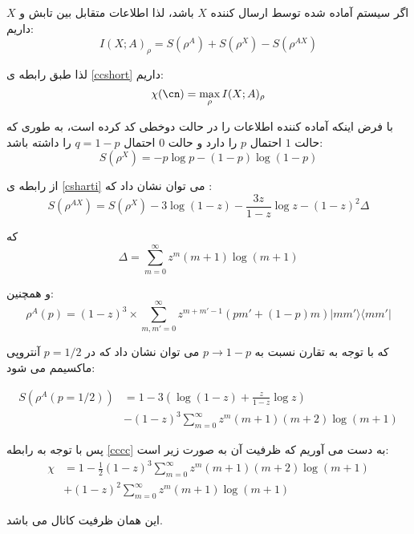 اگر سیستم آماده شده توسط ارسال کننده 
$X$
باشد، لذا اطلاعات متقابل بین تابش و 
$X$
داریم:
\begin{equation} \label{cccc}
	I(X;A)_\rho = S(\rho^A) + S(\rho^X) - S(\rho^{AX})
\end{equation}

لذا طبق رابطه ی 
\ref{ccshort}
داریم:
\begin{equation}
\chi(\cn) = \max_\rho I(X;A)_\rho
\end{equation}

با فرض اینکه آماده کننده اطلاعات را در حالت دوخطی
کد کرده است، به طوری که حالت 
$1$
 احتمال
$p$
را دارد و حالت 
$0$
احتمال
$q=1-p$
را داشته باشد:
\begin{equation}
	S(\rho^X) = -p \log p - (1-p) \log (1-p)
\end{equation}

از رابطه ی
\ref{csharti}
می توان نشان داد که 
\cite{cit}
:
\begin{equation}
	S(\rho^{AX}) = S(\rho^X) - 3 \log (1-z) - \frac{3z}{1-z} \log z - (1-z)^2 \Delta
\end{equation}

که 
\begin{equation}
	\Delta = \sum_{m=0}^{\infty} z^m (m+1) \log(m+1)
\end{equation}

و همچنین:
\begin{equation}
	\rho^A (p) = (1-z)^3 \times \sum_{m,m' =0}^{\infty} z^{m+m'-1} (pm' + (1-p)m) |mm'\rangle \langle mm'|
\end{equation}

که با توجه به تقارن نسبت به 
$p \to 1-p$
می توان نشان داد که در 
$p=1/2$
آنتروپی ماکسیمم می شود:

\begin{align}
	S(\rho^A(p=1/2)) &= 1- 3(\log(1-z) + \frac{z}{1-z} \log z) \\
	& - (1-z)^3 \sum_{m=0}^{\infty} z^m(m+1)(m+2) \log(m+1) 
\end{align}

پس با توجه به رابطه
\ref{cccc}
به دست می آوریم که ظرفیت آن به صورت زیر است:
\begin{align} \label{ccfin}
	\chi &= 1 - \frac{1}{2} (1-z)^3 \sum_{m=0}^{\infty}  z^m (m+1)(m+2) \log (m+1) \\
	& + (1-z)^2 \sum_{m=0}^{\infty} z^m (m+1) \log (m+1)
\end{align}


این همان ظرفیت 
کانال
می باشد.
